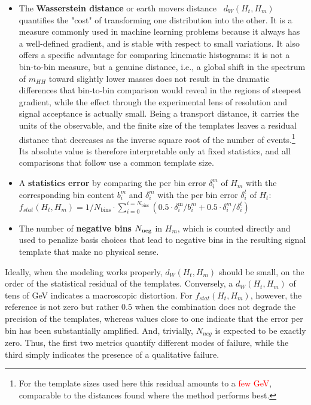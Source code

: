 \begin{itemize}
    \item The \textbf{Wasserstein distance} or earth movers distance~\cite{ramdas2015wassersteinsampletestingrelated,2020SciPy-NMeth} $d_W(H_{t},H_{m})$ quantifies the "cost" of transforming one distribution into the other. It is a measure commonly used in machine learning problems because it always has a well-defined gradient, and is stable with respect to small variations. It also offers a specific advantage for comparing kinematic histograms: it is not a bin-to-bin measure, but a genuine distance, i.e., a global shift in the spectrum of $m_{HH}$ toward slightly lower masses does not result in the dramatic differences that bin-to-bin comparison would reveal in the regions of steepest gradient, while the effect through the experimental lens of resolution and signal acceptance is actually small. Being a transport distance, it carries the units of the observable, and the finite size of the templates leaves a residual distance that decreases as the inverse square root of the number of events.\footnote{For the template sizes used here this residual amounts to a \textcolor{red}{few GeV}, comparable to the distances found where the method performs best.} Its absolute value is therefore interpretable only at fixed statistics, and all comparisons that follow use a common template size.
    \item A \textbf{statistics error} by comparing the per bin error $\delta_i^{m}$ of $H_{m}$ with the corresponding bin content $b_i^{m}$ and $\delta_i^{m}$ with the per bin error $\delta_i^{t}$ of $H_{t}$:\\ $f_{stat}(H_{t},H_{m})=1/N_\text{bins}\cdot\sum_{i=0}^{i=N_\text{bins}}(0.5\cdot\delta_i^\text{m}/b_i^{m} +0.5\cdot\delta_i^{m}/\delta_i^{t})$
    \item The number of \textbf{negative bins} $N_{\rm neg}$ in $H_m$, which is counted directly and used to penalize basis choices that lead to negative bins in the resulting signal template that make no physical sense.
\end{itemize}
%

Ideally, when the modeling works properly, $d_W(H_{t},H_{m})$ should be small, on the order of the statistical residual of the templates. Conversely, a $d_W(H_{t},H_{m})$ of tens of GeV indicates a macroscopic distortion. For $f_{stat}(H_{t},H_{m})$, however, the reference is not zero but rather $0.5$ when the combination does not degrade the precision of the templates, whereas values close to one indicate that the error per bin has been substantially amplified. And, trivially, $N_{neg}$ is expected to be exactly zero. Thus, the first two metrics quantify different modes of failure, while the third simply indicates the presence of a qualitative failure.

